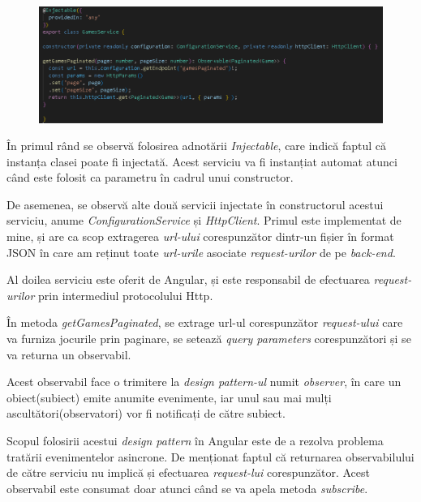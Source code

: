\documentclass[12pt,a4paper]{report}
\begin{document}
\begin{figure}[H]
\centering
\caption{}
\begin{adjustbox}{max size={\textwidth}{\textheight}}
\includegraphics{exemplu_32_games_paginated_service}
\end{adjustbox}

\caption*{}
\end{figure}

În primul rând se observă folosirea adnotării \emph{Injectable}, care indică faptul că instanța clasei poate fi injectată. Acest serviciu va fi instanțiat automat atunci când este folosit ca parametru în cadrul unui constructor.

De asemenea, se observă alte două servicii injectate în constructorul acestui serviciu, anume \emph{ConfigurationService} și \emph{HttpClient}. Primul este implementat de mine, și are ca scop extragerea \emph{url-ului} corespunzător dintr-un fișier în format JSON în care am reținut toate \emph{url-urile} asociate \emph{request-urilor} de pe \emph{back-end}.

Al doilea serviciu este oferit de Angular, și este responsabil de efectuarea \emph{request-urilor} prin intermediul protocolului Http.

În metoda \emph{getGamesPaginated}, se extrage url-ul corespunzător \emph{request-ului} care va furniza jocurile prin paginare, se setează \emph{query parameters} corespunzători și se va returna un observabil.

Acest observabil face o trimitere la \emph{design pattern-ul} numit \emph{observer}, în care un obiect(subiect) emite anumite evenimente, iar unul sau mai mulți ascultători(observatori) vor fi notificați de către subiect. \cite{33}

Scopul folosirii acestui \emph{design pattern} în Angular este de a rezolva problema tratării evenimentelor asincrone. De menționat faptul că returnarea observabilului de către serviciu nu implică și efectuarea \emph{request-lui} corespunzător. Acest observabil este consumat doar atunci când se va apela metoda \emph{subscribe}.
\end{document}
